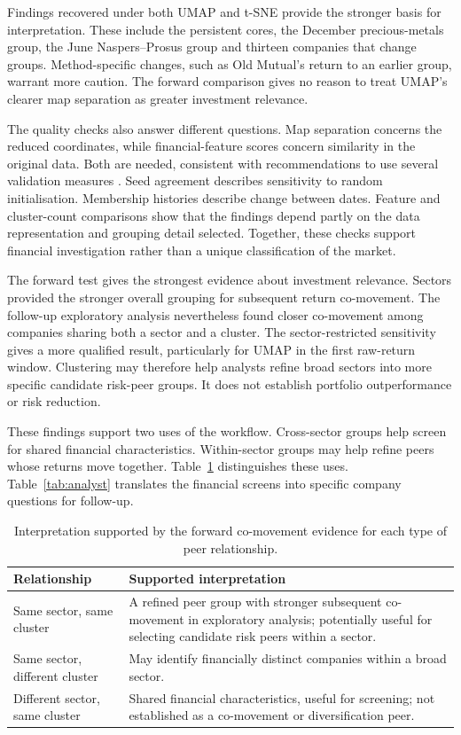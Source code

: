 Findings recovered under both UMAP and t-SNE provide the stronger basis for interpretation. These include the persistent cores, the December precious-metals group, the June Naspers--Prosus group and thirteen companies that change groups. Method-specific changes, such as Old Mutual's return to an earlier group, warrant more caution. The forward comparison gives no reason to treat UMAP's clearer map separation as greater investment relevance.

The quality checks also answer different questions. Map separation concerns the reduced coordinates, while financial-feature scores concern similarity in the original data. Both are needed, consistent with recommendations to use several validation measures \citep{arbelaitz2013,vendramin2010}. Seed agreement describes sensitivity to random initialisation. Membership histories describe change between dates. Feature and cluster-count comparisons show that the findings depend partly on the data representation and grouping detail selected. Together, these checks support financial investigation rather than a unique classification of the market.

The forward test gives the strongest evidence about investment relevance. Sectors provided the stronger overall grouping for subsequent return co-movement. The follow-up exploratory analysis nevertheless found closer co-movement among companies sharing both a sector and a cluster. The sector-restricted sensitivity gives a more qualified result, particularly for UMAP in the first raw-return window. Clustering may therefore help analysts refine broad sectors into more specific candidate risk-peer groups. It does not establish portfolio outperformance or risk reduction.

These findings support two uses of the workflow. Cross-sector groups help screen for shared financial characteristics. Within-sector groups may help refine peers whose returns move together. Table~\ref{tab:relationships} distinguishes these uses. Table~\ref{tab:analyst} translates the financial screens into specific company questions for follow-up.

\begin{table}[htbp]
\centering\caption{Interpretation supported by the forward co-movement evidence for each type of peer relationship.}\label{tab:relationships}
\footnotesize
\begin{tabularx}{\linewidth}{@{}>{\raggedright\arraybackslash}p{4.2cm}X@{}}
\toprule
Relationship & Supported interpretation \\
\midrule
Same sector, same cluster & A refined peer group with stronger subsequent co-movement in exploratory analysis; potentially useful for selecting candidate risk peers within a sector. \\
Same sector, different cluster & May identify financially distinct companies within a broad sector. \\
Different sector, same cluster & Shared financial characteristics, useful for screening; not established as a co-movement or diversification peer. \\
\bottomrule
\end{tabularx}
\end{table}

